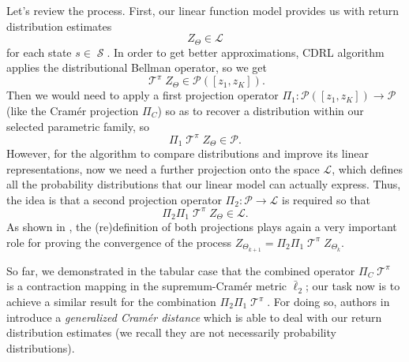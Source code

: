 \documentclass[12pt,a4paper,openright,twoside]{article}
\DeclareMathOperator*{\Sspace}{\mathcal{S}}
\DeclareMathOperator*{\T}{\mathcal{T}}
\numberwithin{equation}{section}
\theoremstyle{definition}
\theoremstyle{remark}
\theoremstyle{plain}
\begin{document}
Let's review the process. First, our linear function model provides us with return distribution estimates 
$$Z_\Theta \in \mathcal{L}$$
 for each state $s \in \Sspace$. In order to get better approximations, CDRL algorithm applies the distributional Bellman operator, so we get
 $${\T}^\pi Z_{\Theta} \in \mathscr{P}([z_1,z_K]).$$
 Then we would need to apply a first projection operator $\Pi_1 : \mathscr{P}([z_1,z_K]) \rightarrow \mathcal{P}$ (like the Cramér projection $\Pi_C$) so as to recover a distribution within our selected parametric family, so
 $$\Pi_1 {\T}^\pi Z_{\Theta} \in \mathcal{P}.$$
 However, for the algorithm to compare distributions and improve its linear representations, now we need a further projection onto the space $\mathcal{L}$, which defines all the probability distributions that our linear model can actually express. Thus, the idea is that a second projection operator $\Pi_{2} : \mathcal{P} \rightarrow \mathcal{L}$ is required so that
 $$\Pi_2 \Pi_1 {\T}^\pi Z_{\Theta} \in \mathcal{L}.$$
As shown in \cite{DRLlinear}, the (re)definition of both projections plays again a very important role for proving the convergence of the process $Z_{\Theta_{k+1}} = \Pi_2 \Pi_1 {\T}^\pi Z_{\Theta_{k}}$. 

So far, we demonstrated in the tabular case that the combined operator $\Pi_C \T^\pi$ is a contraction mapping in the supremum-Cramér metric $\bar{\ell}_2$; our task now is to achieve a similar result for the combination $ \Pi_2 \Pi_1 {\T}^\pi$. For doing so, authors in \cite{DRLlinear} introduce a \textit{generalized Cramér distance} which is able to deal with our return distribution estimates (we recall they are not necessarily probability distributions).
\end{document}
